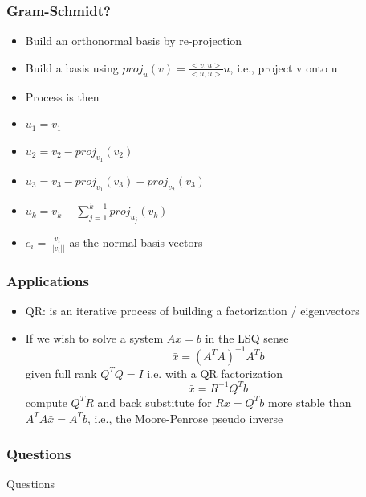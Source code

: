 \documentclass[10pt]{beamer}
\begin{document}
\begin{frame}
  \frametitle{Gram-Schmidt? }
  \begin{itemize}
  \item Build an orthonormal basis by re-projection
  \item Build a basis using $proj_u (v) = \frac{<v,u>}{<u,u>} u$, i.e., project v onto u
  \item Process is then
  \item $u_1 = v_1$
  \item $u_2 = v_2 - proj_{v_1}(v_2)$
  \item $u_3 = v_3 - proj_{v_1}(v_3) - proj_{v_2}(v_3)$
  \item $u_k = v_k - \sum_{j=1}^{k-1} proj_{u_j}(v_k)$
  \item $e_i = \frac{v_i}{||v_i||}$ as the normal basis vectors
  \end{itemize}
\end{frame}

\begin{frame}
  \frametitle{Applications}
  \begin{itemize}
  \item QR: is an iterative process of building a factorization / eigenvectors
  \item If we wish to solve a system $A x = b$ in the LSQ sense
    \[
      \bar{x} = (A^T A)^{-1} A^T b
    \]
    given full rank $Q^T Q = I$ i.e. with a QR factorization
    \[
      \bar{x} = R^{-1} Q^T b
    \]
    compute $Q^T R$ and back substitute for $R \bar{x} = Q^T b$ more stable than
    $ A^T A \bar{x} = A^T b$, i.e., the Moore-Penrose pseudo inverse
  \end{itemize}
\end{frame}

\begin{frame}
  \frametitle{Questions}
  \centerline{\Huge Questions}
\end{frame}
\end{document}
